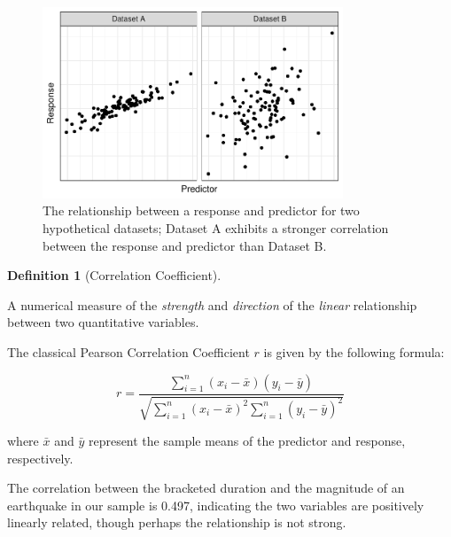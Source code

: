 \documentclass[
  letterpaper,
  DIV=11,
  numbers=noendperiod]{scrreprt}
\theoremstyle{definition}
\newtheorem{definition}{Definition}[chapter]
\theoremstyle{definition}
\theoremstyle{plain}
\theoremstyle{remark}
\begin{document}
\begin{figure}

{\centering \includegraphics[width=0.8\textwidth,height=\textheight]{./images/fig-regsummaries-correlation-1.pdf}

}

\caption{\label{fig-regsummaries-correlation}The relationship between a
response and predictor for two hypothetical datasets; Dataset A exhibits
a stronger correlation between the response and predictor than Dataset
B.}

\end{figure}

\begin{definition}[Correlation
Coefficient]\protect\hypertarget{def-correlation-coefficient}{}\label{def-correlation-coefficient}

A numerical measure of the \emph{strength} and \emph{direction} of the
\emph{linear} relationship between two quantitative variables.

The classical Pearson Correlation Coefficient \(r\) is given by the
following formula:

\[r = \frac{\sum_{i=1}^{n} \left(x_i - \bar{x}\right)\left(y_i - \bar{y}\right)}{\sqrt{\sum_{i=1}^n \left(x_i - \bar{x}\right)^2 \sum_{i=1}^n \left(y_i - \bar{y}\right)^2}}\]

where \(\bar{x}\) and \(\bar{y}\) represent the sample means of the
predictor and response, respectively.

\end{definition}

The correlation between the bracketed duration and the magnitude of an
earthquake in our sample is 0.497, indicating the two variables are
positively linearly related, though perhaps the relationship is not
strong.
\end{document}
